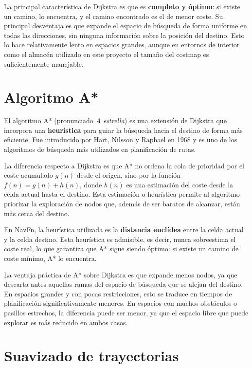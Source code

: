 La principal característica de Dijkstra es que es \textbf{completo y óptimo}: si existe un camino, lo encuentra, y el camino encontrado es el de menor coste. Su principal desventaja es que expande el espacio de búsqueda de forma uniforme en todas las direcciones, sin ninguna información sobre la posición del destino. Esto lo hace relativamente lento en espacios grandes, aunque en entornos de interior como el almacén utilizado en este proyecto el tamaño del costmap es suficientemente manejable.

\section{Algoritmo A*}

El algoritmo A* (pronunciado \textit{A estrella})\cite{hart1968} es una extensión de Dijkstra que incorpora una \textbf{heurística} para guiar la búsqueda hacia el destino de forma más eficiente. Fue introducido por Hart, Nilsson y Raphael en 1968 y es uno de los algoritmos de búsqueda más utilizados en planificación de rutas.

La diferencia respecto a Dijkstra es que A* no ordena la cola de prioridad por el coste acumulado $g(n)$ desde el origen, sino por la función $f(n) = g(n) + h(n)$, donde $h(n)$ es una estimación del coste desde la celda actual hasta el destino. Esta estimación o heurística permite al algoritmo priorizar la exploración de nodos que, además de ser baratos de alcanzar, están más cerca del destino.

En NavFn, la heurística utilizada es la \textbf{distancia euclídea} entre la celda actual y la celda destino. Esta heurística es admisible, es decir, nunca sobreestima el coste real, lo que garantiza que A* sigue siendo óptimo: si existe un camino de coste mínimo, A* lo encuentra.

La ventaja práctica de A* sobre Dijkstra es que expande menos nodos, ya que descarta antes aquellas ramas del espacio de búsqueda que se alejan del destino. En espacios grandes y con pocas restricciones, esto se traduce en tiempos de planificación significativamente menores. En espacios con muchos obstáculos o pasillos estrechos, la diferencia puede ser menor, ya que el espacio libre que puede explorar es más reducido en ambos casos.

\section{Suavizado de trayectorias}


